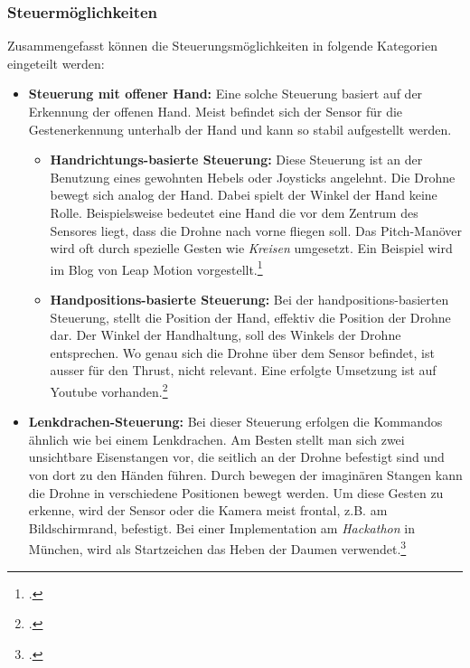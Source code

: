 \subsubsection{Steuermöglichkeiten}
Zusammengefasst können die Steuerungsmöglichkeiten in folgende Kategorien eingeteilt werden:
\begin{itemize}

	\item \textbf{Steuerung mit offener Hand:}
	Eine solche Steuerung basiert auf der Erkennung der offenen Hand.
	Meist befindet sich der Sensor für die Gestenerkennung unterhalb der Hand und kann so stabil aufgestellt werden.

		\begin{itemize}

			\item \textbf{Handrichtungs-basierte Steuerung:}
			Diese Steuerung ist an der Benutzung eines gewohnten Hebels oder Joysticks angelehnt. Die Drohne bewegt sich analog der Hand. Dabei spielt der Winkel der Hand keine Rolle.
			Beispielsweise bedeutet eine Hand die vor dem Zentrum des Sensores liegt, dass die Drohne nach vorne fliegen soll. Das Pitch-Manöver wird oft durch spezielle Gesten wie \textit{Kreisen} umgesetzt.
			Ein Beispiel wird im Blog von Leap Motion vorgestellt.\footcite{The_Beginning_of_a_Drone_Revolution_Leap_Motion_Blog_2015-04-29}

			\item \textbf{Handpositions-basierte Steuerung:}
			Bei der handpositions-basierten Steuerung, stellt die Position der Hand, effektiv die Position der Drohne dar. Der Winkel der Handhaltung, soll des Winkels der Drohne entsprechen.
			Wo genau sich die Drohne über dem Sensor befindet, ist ausser für den Thrust, nicht relevant.
			Eine erfolgte Umsetzung ist auf Youtube vorhanden.\footcite{Flying_the_Crazyflie_with_Leap_Motion_YouTube_2015-04-29}
		\end{itemize}

	\item \textbf{Lenkdrachen-Steuerung:}
	Bei dieser Steuerung erfolgen die Kommandos ähnlich wie bei einem Lenkdrachen.
	Am Besten stellt man sich zwei unsichtbare Eisenstangen vor, die seitlich an der Drohne befestigt sind und von dort zu den Händen führen. Durch bewegen der imaginären Stangen kann die Drohne in verschiedene Positionen bewegt werden.
	Um diese Gesten zu erkenne, wird der Sensor oder die Kamera meist frontal, z.B. am Bildschirmrand, befestigt.
	Bei einer Implementation am \textit{Hackathon} in München, wird als Startzeichen das Heben der Daumen verwendet.\footcite{Drones_Fly_Hands_Free_with_Gestural_Technology_2015-04-29}


\end{itemize}
